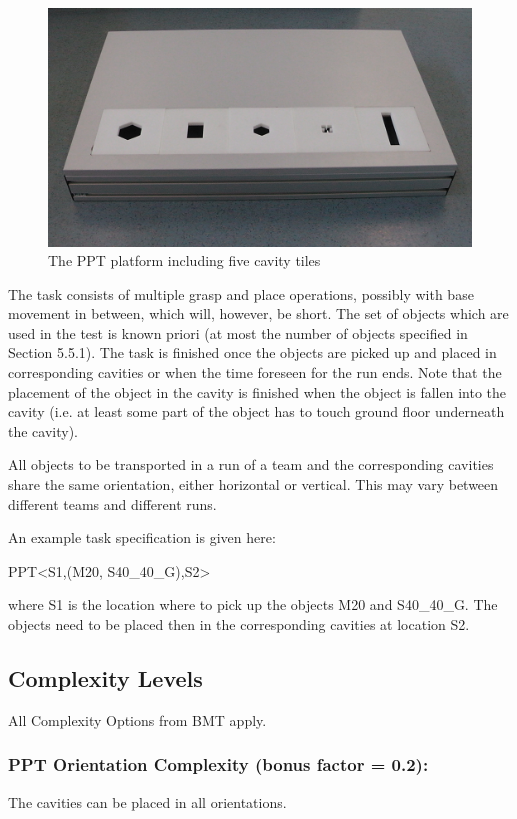 \begin{figure}
\includegraphics[width= \textwidth ]{../images/ppt_plattform.jpg}
\caption{The PPT platform including five cavity tiles}
\label{fig:ppt_plattform}
\end{figure}

The task consists of multiple grasp and place operations, possibly with base movement in between, which will, however, be short. The set of objects which are used in the test is known priori (at most the number of objects specified in Section 5.5.1). The task is finished once the objects are picked up and placed in corresponding cavities or when the time foreseen for the run ends. Note that the placement of the object in the cavity is finished when the object is fallen into the cavity (i.e. at least some part of the object has to touch ground floor underneath the cavity).
\par
All objects to be transported in a run of a team and the corresponding cavities share the same orientation, either horizontal or vertical. This may vary between different teams and different runs.
\par
An example task specification is given here:
\par
PPT\textless S1,(M20, S40\_40\_G),S2\textgreater
\par
where S1 is the location where to pick up the objects M20 and S40\_40\_G. The objects need to be placed then in the corresponding cavities at location S2.

\subsection{Complexity Levels}

All Complexity Options from BMT apply.

\subsubsection{PPT Orientation Complexity (bonus factor = 0.2):}
The cavities can be placed in all orientations.
